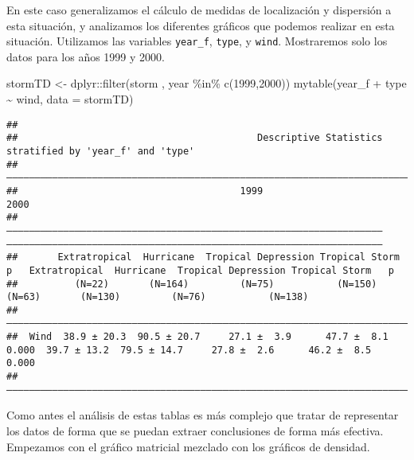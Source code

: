 \documentclass[
]{book}
\newenvironment{Shaded}{\begin{snugshade}}{\end{snugshade}}
\newcommand{\AttributeTok}[1]{\textcolor[rgb]{0.77,0.63,0.00}{#1}}
\newcommand{\DecValTok}[1]{\textcolor[rgb]{0.00,0.00,0.81}{#1}}
\newcommand{\FunctionTok}[1]{\textcolor[rgb]{0.00,0.00,0.00}{#1}}
\newcommand{\NormalTok}[1]{#1}
\newcommand{\OtherTok}[1]{\textcolor[rgb]{0.56,0.35,0.01}{#1}}
\newcommand{\SpecialCharTok}[1]{\textcolor[rgb]{0.00,0.00,0.00}{#1}}
\begin{document}
En este caso generalizamos el cálculo de medidas de localización y dispersión a esta situación, y analizamos los diferentes gráficos que podemos realizar en esta situación. Utilizamos las variables \texttt{year\_f}, \texttt{type}, y \texttt{wind}. Mostraremos solo los datos para los años 1999 y 2000.

\begin{Shaded}
\begin{Highlighting}[]
\NormalTok{stormTD }\OtherTok{\textless{}{-}}\NormalTok{ dplyr}\SpecialCharTok{::}\FunctionTok{filter}\NormalTok{(storm , year }\SpecialCharTok{\%in\%} \FunctionTok{c}\NormalTok{(}\DecValTok{1999}\NormalTok{,}\DecValTok{2000}\NormalTok{))}
\FunctionTok{mytable}\NormalTok{(year\_f }\SpecialCharTok{+}\NormalTok{ type }\SpecialCharTok{\textasciitilde{}}\NormalTok{ wind, }\AttributeTok{data =}\NormalTok{ stormTD)}
\end{Highlighting}
\end{Shaded}

\begin{verbatim}
## 
##                                          Descriptive Statistics stratified by 'year_f' and 'type'                                         
## ——————————————————————————————————————————————————————————————————————————————————————————————————————————————————————————————————————————— 
##                                       1999                                                                2000                                
##       —————————————————————————————————————————————————————————————————— —————————————————————————————————————————————————————————————————— 
##       Extratropical  Hurricane  Tropical Depression Tropical Storm   p   Extratropical  Hurricane  Tropical Depression Tropical Storm   p  
##          (N=22)       (N=164)         (N=75)           (N=150)             (N=63)       (N=130)         (N=76)           (N=138)         
## ——————————————————————————————————————————————————————————————————————————————————————————————————————————————————————————————————————————— 
##  Wind  38.9 ± 20.3  90.5 ± 20.7     27.1 ±  3.9      47.7 ±  8.1   0.000  39.7 ± 13.2  79.5 ± 14.7     27.8 ±  2.6      46.2 ±  8.5   0.000
## ———————————————————————————————————————————————————————————————————————————————————————————————————————————————————————————————————————————
\end{verbatim}

Como antes el análisis de estas tablas es más complejo que tratar de representar los datos de forma que se puedan extraer conclusiones de forma más efectiva. Empezamos con el gráfico matricial mezclado con los gráficos de densidad.
\end{document}
